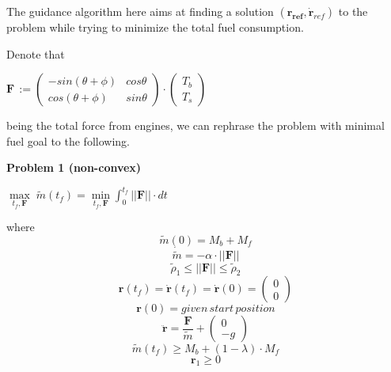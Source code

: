 \documentclass[notitlepage,twocolumn,10pt]{article}
\begin{document}
The guidance algorithm here aims at finding a solution $(\mathbf{r_{ref}}, \dot{\mathbf{r}}_{ref})$ to the problem while trying to minimize the total fuel consumption.

Denote that  

$\mathbf{F} \, := \left( \begin{matrix}
    -sin(\theta + \phi) & cos\theta \\
    cos(\theta + \phi) & sin\theta
\end{matrix} \right) \cdot \left( \begin{matrix}
  T_{b} \\
  T_{s} 
\end{matrix} \right)$ 

being the total force from engines, we can rephrase the problem with minimal fuel goal to the following.

\textbf{Problem 1 (non-convex)}

$\underset{t_f, \mathbf{F}}{\max} \; \tilde{m}(t_f) = \underset{t_f, \mathbf{F}}{\min} \int_{0}^{t_f} ||\mathbf{F}|| \cdot dt$

where
\begin{equation*}
\tilde{m}(0) = M_{b} + M_{f}
\end{equation*}
\begin{equation*}
\dot{\tilde{m}} = -\alpha \cdot ||\mathbf{F}||
\end{equation*}
\begin{equation*} \label{eqs:esrho}
\tilde{\rho}_1 \le ||\mathbf{F}|| \le \tilde{\rho}_2 
\end{equation*}
\begin{equation*}
\mathbf{r}(t_f) = \dot{\mathbf{r}}(t_f) = \dot{\mathbf{r}}(0) = \begin{pmatrix} 0 \\ 0 \end{pmatrix}
\end{equation*}
\begin{equation*}
\mathbf{r}(0) = given \, start \, position
\end{equation*}
\begin{equation*}
\ddot{\mathbf{r}} = \frac{\mathbf{F}}{\tilde{m}} + \begin{pmatrix} 0 \\ - g \end{pmatrix}
\end{equation*}
\begin{equation*}
\tilde{m}(t_f) \ge M_b + (1 - \lambda) \cdot M_f
\end{equation*}
\begin{equation*} 
\mathbf{r}_1 \ge 0 
\end{equation*}
\end{document}
